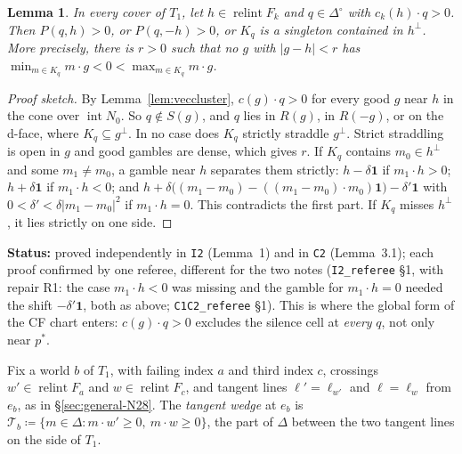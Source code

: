 \documentclass[11pt]{article}
\newtheorem{lemma}[theorem]{Lemma}
\theoremstyle{definition}
\theoremstyle{remark}
\newcommand{\one}{\mathbf 1}
\newcommand{\Di}{\Delta^{\circ}}
\newcommand{\relint}{\operatorname{relint}}
\newcommand{\src}[1]{\texttt{#1}}
\newcommand{\status}[1]{\par\smallskip\noindent\textbf{Status:} #1\par\smallskip}
\begin{document}
\begin{lemma}\label{lem:nostraddle}
In every cover of $T_1$, let $h\in\relint F_k$ and $q\in\Di$ with $c_k(h)\cdot q>0$. Then $P(q,h)>0$, or $P(q,-h)>0$, or $K_q$ is a singleton contained in $h^\perp$. More precisely, there is $r>0$ such that no $g$ with $|g-h|<r$ has $\min_{m\in K_q}m\cdot g<0<\max_{m\in K_q}m\cdot g$.
\end{lemma}
\begin{proof}[Proof sketch]
By Lemma~\ref{lem:veccluster}, $c(g)\cdot q>0$ for every good $g$ near $h$ in the cone over $\operatorname{int}N_0$. So $q\notin S(g)$, and $q$ lies in $R(g)$, in $R(-g)$, or on the d-face, where $K_q\subseteq g^\perp$. In no case does $K_q$ strictly straddle $g^\perp$. Strict straddling is open in $g$ and good gambles are dense, which gives $r$. If $K_q$ contains $m_0\in h^\perp$ and some $m_1\ne m_0$, a gamble near $h$ separates them strictly: $h-\delta\one$ if $m_1\cdot h>0$; $h+\delta\one$ if $m_1\cdot h<0$; and $h+\delta\bigl((m_1-m_0)-((m_1-m_0)\cdot m_0)\one\bigr)-\delta'\one$ with $0<\delta'<\delta|m_1-m_0|^2$ if $m_1\cdot h=0$. This contradicts the first part. If $K_q$ misses $h^\perp$, it lies strictly on one side.
\end{proof}
\status{proved independently in \src{I2} (Lemma~1) and in \src{C2} (Lemma~3.1); each proof confirmed by one referee, different for the two notes (\src{I2\_referee} \S1, with repair R1: the case $m_1\cdot h<0$ was missing and the gamble for $m_1\cdot h=0$ needed the shift $-\delta'\one$, both as above; \src{C1C2\_referee} \S1). This is where the global form of the CF chart enters: $c(g)\cdot q>0$ excludes the silence cell at \emph{every} $q$, not only near $p^*$.}

Fix a world $b$ of $T_1$, with failing index $a$ and third index $c$, crossings $w'\in\relint F_a$ and $w\in\relint F_c$, and tangent lines $\ell'=\ell_{w'}$ and $\ell=\ell_w$ from $e_b$, as in \S\ref{sec:general-N28}. The \emph{tangent wedge} at $e_b$ is $\mathcal T_b\coloneqq\{m\in\Delta:m\cdot w'\ge0,\ m\cdot w\ge0\}$, the part of $\Delta$ between the two tangent lines on the side of $T_1$.
\end{document}
